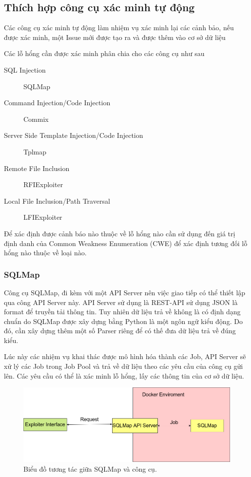 \documentclass[./../main.tex]{subfiles}
\begin{document}
\subsection{Thích hợp công cụ xác minh tự động}
Các công cụ xác minh tự động làm nhiệm vụ xác minh lại các cảnh bảo, nếu được xác minh, một Issue mới được tạo ra và được thêm vào cơ sở dữ liệu

Các lỗ hổng cần được xác minh phân chia cho các công cụ như sau
\begin{description}
	\item[SQL Injection] SQLMap
	\item [Command Injection/Code Injection] Commix
	\item [Server Side Template Injection/Code Injection] Tplmap
	\item [Remote File Inclusion] RFIExploiter
	\item [Local File Inclusion/Path Traversal] LFIExploiter
\end{description}
Để xác định được cảnh báo nào thuộc về lỗ hổng nào cần sử dụng đến giá trị định danh của Common Weakness Enumeration (CWE) để xác định tương đối lỗ hổng nào thuộc về loại nào.
\subsubsection{SQLMap}
Công cụ SQLMap, đi kèm với một API Server nên việc giao tiếp có thể thiết lập qua công API Server này. API Server sử dụng là REST-API sử dụng JSON là format để truyền tải thông tin. Tuy nhiên dữ liệu trả về không là có định dạng chuẩn do SQLMap được xây dựng bằng Python là một ngôn ngữ kiểu động. Do đó, cần xây dựng thêm một số Parser riêng để có thế đưa dữ liệu trả về đúng kiểu.

Lúc này các nhiệm vụ khai thác được mô hình hóa thành các Job, API Server sẽ xử lý các Job trong Job Pool và trả về dữ liệu theo các yêu cầu của công cụ gửi lên. Các yêu cầu có thể là xác minh lỗ hổng, lấy các thông tin của cơ sở dữ liệu.


\begin{figure}[H]
	\includegraphics[width=\linewidth]{./images/SQLMap.png}
	\caption{Biểu đồ tương tác giữa SQLMap và công cụ.}
	\label{fig:sqlmap}
\end{figure}
\end{document}
